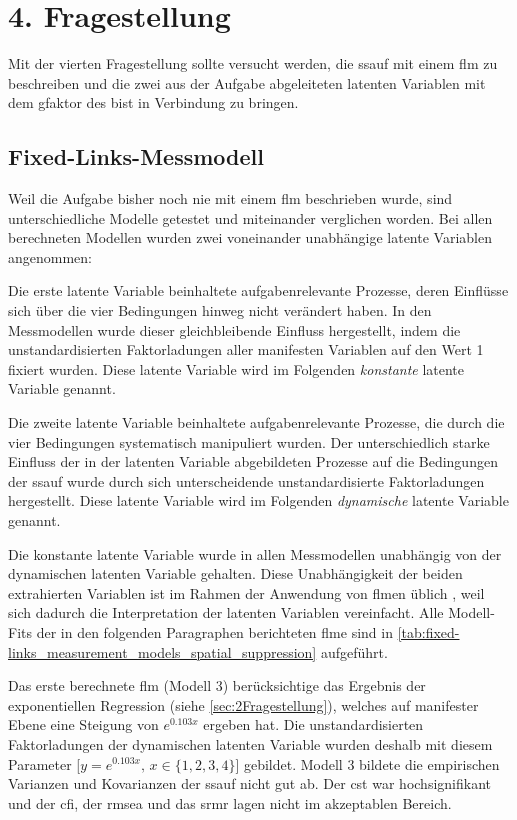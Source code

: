 \documentclass[11pt, twoside, a4paper]{book}		%
\begin{document}
\section{4. Fragestellung \label{sec:4Fragestellung}}

Mit der vierten Fragestellung sollte versucht werden, die \gls{ssauf} mit einem \gls{flm} zu beschreiben und die zwei aus der Aufgabe abgeleiteten latenten Variablen mit dem \gls{gfaktor} des \gls{bist} in Verbindung zu bringen.


\subsection{Fixed-Links-Messmodell \label{subsec:spatial_suppression_fixed_links_messmodell}}


Weil die Aufgabe bisher noch nie mit einem \gls{flm} beschrieben wurde, sind unterschiedliche Modelle getestet und miteinander verglichen worden. Bei allen berechneten Modellen wurden zwei voneinander unabhängige latente Variablen angenommen: 

Die erste latente Variable beinhaltete aufgabenrelevante Prozesse, deren Einflüsse sich über die vier Bedingungen hinweg nicht verändert haben. In den Messmodellen wurde dieser gleichbleibende Einfluss hergestellt, indem die unstandardisierten Faktorladungen aller manifesten Variablen auf den Wert 1 fixiert wurden. Diese latente Variable wird im Folgenden \textit{konstante} latente Variable genannt. 

Die zweite latente Variable beinhaltete aufgabenrelevante Prozesse, die durch die vier Bedingungen systematisch manipuliert wurden. Der unterschiedlich starke Einfluss der in der latenten Variable abgebildeten Prozesse auf die Bedingungen der \gls{ssauf} wurde durch sich unterscheidende unstandardisierte Faktorladungen hergestellt. Diese latente Variable wird im Folgenden \textit{dynamische} latente Variable genannt.

Die konstante latente Variable wurde in allen Messmodellen unabhängig von der dynamischen latenten Variable gehalten. Diese Unabhängigkeit der beiden extrahierten Variablen ist im Rahmen der Anwendung von \gls{flm}en üblich \citep[z.B.][]{Leue2012, Schweizer2007, Wang2015}, weil sich dadurch die Interpretation der latenten Variablen vereinfacht.
Alle Modell-Fits der in den folgenden Paragraphen berichteten \gls{flm}e sind in \autoref{tab:fixed-links_measurement_models_spatial_suppression} aufgeführt.

Das erste berechnete \gls{flm} (Modell 3) berücksichtige das Ergebnis der exponentiellen Regression (siehe \autoref{sec:2Fragestellung}), welches auf manifester Ebene eine Steigung von $e^{0.103x}$ ergeben hat. Die unstandardisierten Faktorladungen der dynamischen latenten Variable wurden deshalb mit diesem Parameter [$y=e^{0.103x},\,x\in\{1, 2, 3, 4\}$] gebildet. Modell 3 bildete die empirischen Varianzen und Kovarianzen der \gls{ssauf} nicht gut ab. Der \gls{cst} war hochsignifikant und der \gls{cfi}, der \gls{rmsea} und das \gls{srmr} lagen nicht im akzeptablen Bereich.
\end{document}

